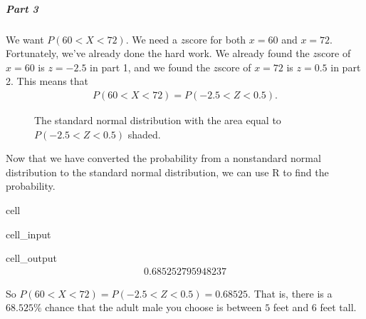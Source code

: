 \documentclass[letterpaper,10pt,english]{jupyterBook}
\begin{document}
\subparagraph{Part 3}
\label{\detokenize{Ch4 The Normal Distribution and the Central Limit Theorem/4.3 The Normal Distribution and z-scores:id4}}
\sphinxAtStartPar
We want \(P(60 < X < 72)\). We need a \(z\)\sphinxhyphen{}score for both \(x = 60\) and \(x = 72\). Fortunately, we’ve already done the hard work. We already found the \(z\)\sphinxhyphen{}score of \(x = 60\) is \(z = -2.5\) in part 1, and we found the \(z\)\sphinxhyphen{}score of \(x = 72\) is \(z = 0.5\) in part 2. This means that
\begin{equation*}
\begin{split} P(60 < X < 72) = P(-2.5 < Z < 0.5). \end{split}
\end{equation*}
\begin{figure}[htbp]
\centering
\capstart

\noindent{}
\caption{The standard normal distribution with the area equal to \(P(-2.5 < Z < 0.5)\) shaded.}\label{\detokenize{Ch4 The Normal Distribution and the Central Limit Theorem/4.3 The Normal Distribution and z-scores:stdnormal-ex10}}\end{figure}

\sphinxAtStartPar
Now that we have converted the probability from a non\sphinxhyphen{}standard normal distribution to the standard normal distribution, we can use R to find the probability.

\begin{sphinxuseclass}{cell}\begin{sphinxVerbatimInput}

\begin{sphinxuseclass}{cell_input}
\begin{sphinxVerbatim}[commandchars=\\\{\}]
\end{sphinxVerbatim}

\end{sphinxuseclass}\end{sphinxVerbatimInput}
\begin{sphinxVerbatimOutput}

\begin{sphinxuseclass}{cell_output}\begin{equation*}
\begin{split}0.685252795948237\end{split}
\end{equation*}
\end{sphinxuseclass}\end{sphinxVerbatimOutput}

\end{sphinxuseclass}
\sphinxAtStartPar
So \(P(60 < X < 72) = P(-2.5 < Z < 0.5) = 0.68525\). That is, there is a \(68.525\%\) chance that the adult male you choose is between \(5\) feet and \(6\) feet tall.
\end{document}
